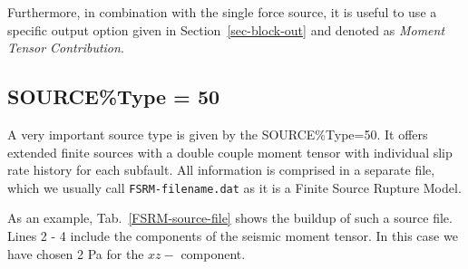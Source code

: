 \documentclass[12pt,twoside]{article}
\begin{document}
Furthermore, in combination with the single force source, it is useful to use a specific output option given in
Section~\ref{sec-block-out} and denoted as {\em Moment Tensor Contribution}.

\subsection{SOURCE\%Type = 50}
\noindent
\hypertarget{src50}{A very important} source type is given by the SOURCE\%Type=50.
It offers extended finite sources with a double couple moment tensor with individual slip rate history for each subfault.
All information is comprised in a separate file, which we usually call {\tt FSRM-filename.dat} as it is a Finite Source Rupture Model.

\noindent
As an example, Tab.~\ref{FSRM-source-file} shows the buildup of such a source file.
Lines 2 - 4 include the components of the seismic moment tensor.
In this case we have chosen 2 Pa for the $xz-$ component.
\end{document}
